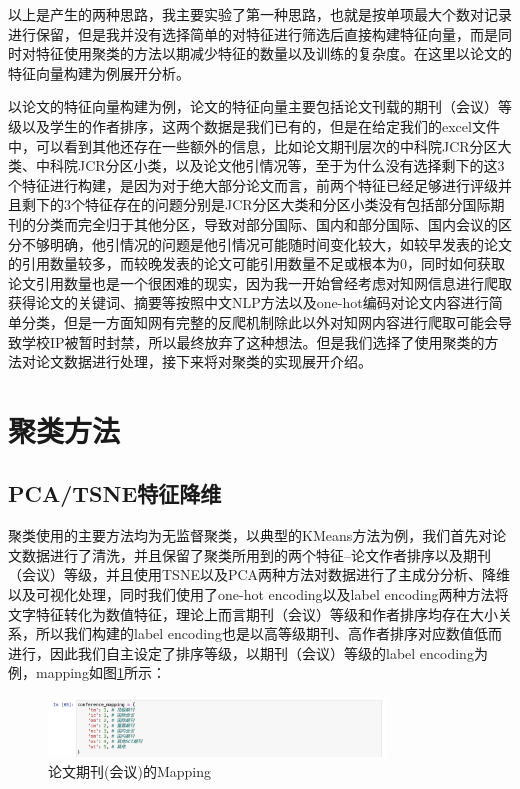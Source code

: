 以上是产生的两种思路，我主要实验了第一种思路，也就是按单项最大个数对记录进行保留，但是我并没有选择简单的对特征进行筛选后直接构建特征向量，而是同时对特征使用聚类的方法以期减少特征的数量以及训练的复杂度。在这里以论文的特征向量构建为例展开分析。

以论文的特征向量构建为例，论文的特征向量主要包括论文刊载的期刊（会议）等级以及学生的作者排序，这两个数据是我们已有的，但是在给定我们的excel文件中，可以看到其他还存在一些额外的信息，比如论文期刊层次的中科院JCR分区大类、中科院JCR分区小类，以及论文他引情况等，至于为什么没有选择剩下的这3个特征进行构建，是因为对于绝大部分论文而言，前两个特征已经足够进行评级并且剩下的3个特征存在的问题分别是JCR分区大类和分区小类没有包括部分国际期刊的分类而完全归于其他分区，导致对部分国际、国内和部分国际、国内会议的区分不够明确，他引情况的问题是他引情况可能随时间变化较大，如较早发表的论文的引用数量较多，而较晚发表的论文可能引用数量不足或根本为0，同时如何获取论文引用数量也是一个很困难的现实，因为我一开始曾经考虑对知网信息进行爬取获得论文的关键词、摘要等按照中文NLP方法以及one-hot编码对论文内容进行简单分类，但是一方面知网有完整的反爬机制除此以外对知网内容进行爬取可能会导致学校IP被暂时封禁，所以最终放弃了这种想法。但是我们选择了使用聚类的方法对论文数据进行处理，接下来将对聚类的实现展开介绍。 

\section{聚类方法}

\subsection{PCA/TSNE特征降维}

聚类使用的主要方法均为无监督聚类，以典型的KMeans方法为例，我们首先对论文数据进行了清洗，并且保留了聚类所用到的两个特征--论文作者排序以及期刊（会议）等级，并且使用TSNE\cite{van2008visualizing}以及PCA两种方法对数据进行了主成分分析、降维以及可视化处理，同时我们使用了one-hot encoding以及label encoding两种方法将文字特征转化为数值特征，理论上而言期刊（会议）等级和作者排序均存在大小关系，所以我们构建的label encoding也是以高等级期刊、高作者排序对应数值低而进行，因此我们自主设定了排序等级，以期刊（会议）等级的label encoding为例，mapping如图\ref{paper-conference-label-encoding}所示：
\begin{figure}[htb]
    \vspace{6pt} %
    \centering
    \includegraphics[width=0.8\textwidth]{images/Paper-conference-mapping.png}
    \caption{论文期刊(会议)的Mapping}\label{paper-conference-label-encoding} %
\end{figure}


